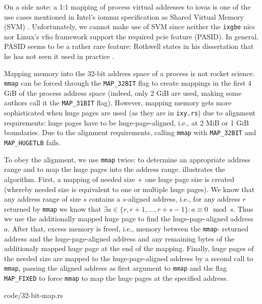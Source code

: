 On a side note: a 1:1 mapping of process virtual addresses to \acp{iova} is one
of the use cases mentioned in Intel's \ac{iommu} specification as Shared Virtual
Memory (SVM) \cite[p.~21]{intel2019iommu}. Unfortunately, we cannot make use of
SVM since neither the \texttt{ixgbe} \acp{nic} nor Linux's \ac{vfio} framework
support the required \ac{pcie} feature (PASID). In general, PASID seems to be a
rather rare feature: Rothwell states in his dissertation that he has not seen it
used in practice \cite[p.~31]{rothwell2018exploitation}.

Mapping memory into the 32-bit address space of a process is not rocket science.
\texttt{mmap} can be forced through the \texttt{MAP\_32BIT} flag to create
mappings in the first 4 GiB of the process address space (indeed, only 2 GiB are
used, making some authors call it the \texttt{MAP\_31BIT} flag). However,
mapping memory gets more sophisticated when huge pages are used (as they are in
\texttt{ixy.rs}) due to alignment requirements: huge pages have to be
huge-page-aligned, i.e., at 2 MiB or 1 GiB boundaries. Due to the alignment
requirements, calling \texttt{mmap} with \texttt{MAP\_32BIT} and
\texttt{MAP\_HUGETLB} fails.

To obey the alignment, we use \texttt{mmap} twice: to determine an appropriate
address range and to map the huge pages into the address range.
 illustrates the algorithm. First, a mapping of needed size
+ one huge page size is created (whereby needed size is equivalent to one or
multiple huge pages). We know that any address range of size $s$ contains a
$s$-aligned address, i.e., for any address $r$ returned by \texttt{mmap} we know
that ${\exists a \in \{r, r + 1, ..., r + s - 1\}: a \equiv 0 \mod s}$. Thus we
use the additionally mapped huge page to find the huge-page-aligned address $a$.
After that, excess memory is freed, i.e., memory between the \texttt{mmap}-
returned address and the huge-page-aligned address and any remaining bytes of
the additionaly mapped huge page at the end of the mapping. Finally, huge pages
of the needed size are mapped to the huge-page-aligned address by a second call
to \texttt{mmap}, passing the aligned address as first argument to \texttt{mmap}
and the flag \texttt{MAP\_FIXED} to force \texttt{mmap} to map the huge pages at
the specified address.

\begin{minipage}{\textwidth}
    
        {code/32-bit-map.rs}
\end{minipage}

